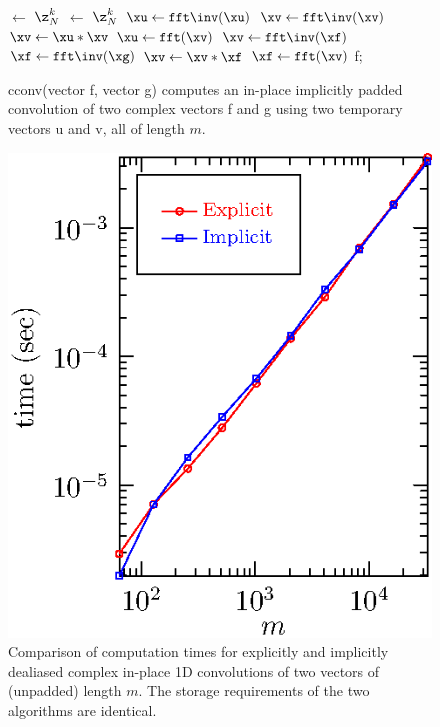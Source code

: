 \documentclass[final]{siamltex}
\begin{document}
\setlength{\algomargin}{0.8em}
\SetAlCapSkip{3pt}
\def\FFT{\tt fft}

\begin{figure}[htbp]
\begin{minipage}{.49\linewidth}
\begin{center}
\begin{function}[H]
  \xu $\leftarrow$ $\z_N^k$ \xf\;
  \xv $\leftarrow$ $\z_N^k$ \xg\;
  \medskip
  $\xu \leftarrow \FFT\inv(\xu)$\;
  $\xv \leftarrow \FFT\inv(\xv)$\;
  $\xv \leftarrow \xu * \xv$\;
  $\xu \leftarrow \FFT(\xv)$\;
  \medskip
  $\xv \leftarrow \FFT\inv(\xf)$\;
  $\xf \leftarrow \FFT\inv(\xg)$\;
  $\xv \leftarrow \xv * \xf$\;
  $\xf \leftarrow \FFT(\xv)$\;
  \Return f;
\caption{cconv(vector {\sf f}, vector {\sf g}) computes
an in-place implicitly padded convolution of two complex vectors {\sf f}
and {\sf g} using two temporary vectors {\sf u} and {\sf v}, all of length
$m$.}\label{cconv}
\end{function}
\end{center}
\end{minipage}
\begin{minipage}{0.49\linewidth}
\begin{center}
\includegraphics{timing1c}
\caption{Comparison of computation times for explicitly and implicitly
dealiased complex in-place 1D convolutions of two vectors of
(unpadded) length $m$. The storage requirements of the two algorithms are
identical.}
\label{timing1c}
\end{center}
\end{minipage}
\end{figure}
\end{document}
